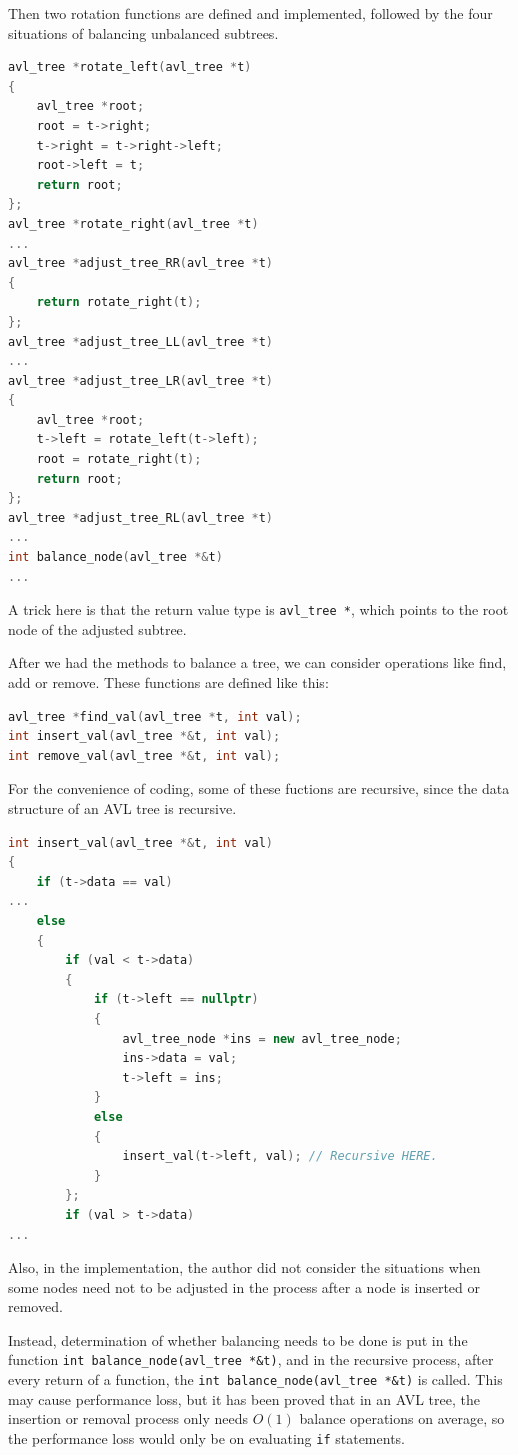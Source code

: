 \documentclass[cn,black,12pt,normal]{elegantnote}
\begin{document}
Then two rotation functions are defined and implemented, followed by the four situations of balancing unbalanced subtrees.
\begin{lstlisting}[language = C++]
avl_tree *rotate_left(avl_tree *t)
{
	avl_tree *root;
	root = t->right;
	t->right = t->right->left;
	root->left = t;
	return root;
};
avl_tree *rotate_right(avl_tree *t)
...
avl_tree *adjust_tree_RR(avl_tree *t)
{
	return rotate_right(t);
};
avl_tree *adjust_tree_LL(avl_tree *t)
...
avl_tree *adjust_tree_LR(avl_tree *t)
{
	avl_tree *root;
	t->left = rotate_left(t->left);
	root = rotate_right(t);
	return root;
};
avl_tree *adjust_tree_RL(avl_tree *t)
...
int balance_node(avl_tree *&t)
...
\end{lstlisting}
A trick here is that the return value type is \lstinline{avl_tree *}, which points to the root node of the adjusted subtree.

After we had the methods to balance a tree, we can consider operations like find, add or remove. These functions are defined like this:
\begin{lstlisting}[language = C++]
avl_tree *find_val(avl_tree *t, int val);
int insert_val(avl_tree *&t, int val);
int remove_val(avl_tree *&t, int val);
\end{lstlisting}
For the convenience of coding, some of these fuctions are recursive, since the data structure of an AVL tree is recursive.

\begin{lstlisting}[language = C++]
int insert_val(avl_tree *&t, int val)
{
	if (t->data == val)
...
	else
	{
		if (val < t->data)
		{
			if (t->left == nullptr)
			{
				avl_tree_node *ins = new avl_tree_node;
				ins->data = val;
				t->left = ins;
			}
			else
			{
				insert_val(t->left, val); // Recursive HERE.
			}
		};
		if (val > t->data)
...
\end{lstlisting}

Also, in the implementation, the author did not consider the situations when some nodes need not to be adjusted in the process after a node is inserted or removed. 

Instead, determination of whether balancing needs to be done is put in the function \lstinline{int balance_node(avl_tree *&t)}, and in the recursive process, after every return of a function, the \lstinline{int balance_node(avl_tree *&t)} is called. This may cause performance loss, but it has been proved that in an AVL tree, the insertion or removal process only needs $O(1)$ balance operations on average, so the performance loss would only be on evaluating \lstinline{if} statements.
\end{document}
